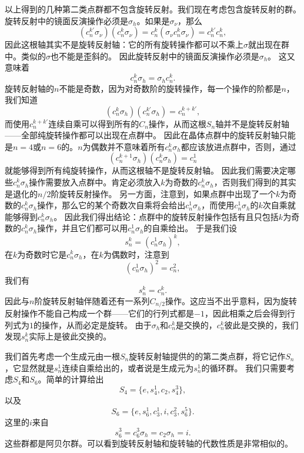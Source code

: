 以上得到的几种第二类点群都不包含旋转反射。我们现在考虑包含旋转反射的群。
旋转反射中的镜面反演操作必须是$\sigma_h$。如果是$\sigma_\nu$，那么
\[
    (c_n^{k'} \sigma_\nu) (c_n^k \sigma_\nu) = c_n^k (\sigma_\nu c_n^k \sigma_\nu) = c_n^{k'} c_n^k, 
\]
因此这根轴其实不是旋转反射轴：它的所有旋转操作都可以不乘上$\sigma$就出现在群中。类似的$\sigma$也不能是歪斜的。
因此旋转反射中的镜面反演操作必须是$\sigma_h$。
这又意味着
\begin{equation}
    c_n^k \sigma_h = \sigma_h c_n^k.
\end{equation}
旋转反射轴的$n$不能是奇数，因为对奇数阶的旋转操作，每一个操作的阶都是$n$，我们知道
\[
    (c_n^k \sigma_h) (c_n^{k'} \sigma_h) = c_n^{k+k'},
\]
而使用$c_n^{k+k'}$连续自乘可以得到所有的$C_n$操作，从而这根$S_n$轴并不是旋转反射轴——全部纯旋转操作都可以出现在点群中。
因此在晶体点群中的旋转反射轴只能是$n=4$或$n=6$的。$n$为偶数并不意味着所有$c_n^k \sigma_h$都应该放进点群中，否则，通过
\[
    (c_n^{k+1} \sigma_h) (c_n^k \sigma_h) = c_n^1
\]
就能够得到所有纯旋转操作，从而这根轴不是旋转反射轴。
因此我们需要决定哪些$c_n^k \sigma_h$操作需要放入点群中。肯定必须放入$k$为奇数的$c_n^k \sigma_h$，否则我们得到的其实是退化的$n/2$阶旋转反射操作。
另一方面，注意到，如果点群中出现了一个$k$为奇数的$c_n^k \sigma_h$操作，那么它的某个奇数次自乘将会给出$c_n^1 \sigma_h$，而使用$c_n^1 \sigma_h$的$k$次自乘就能够得到$c_n^k \sigma_h$。
因此我们得出结论：点群中的旋转反射操作包括有且只包括$k$为奇数的$c_n^k \sigma_h$操作，并且它们都可以用$c_n^1 \sigma_h$的自乘给出。
于是我们设
\begin{equation}
    s_n^k = (c_n^1 \sigma_h)^k,
\end{equation}
在$k$为奇数时它是$c_n^k \sigma_h$，在$k$为偶数时，注意到
\[
    (c_n^1 \sigma_h)^2 = c_n^2,
\]
我们有
\begin{equation}
    s_n^k = c_{n}^{k}.
\end{equation}
因此与$n$阶旋转反射轴伴随着还有一系列$C_{n/2}$操作。这应当不出乎意料，因为旋转反射操作不能自己构成一个群——它们的行列式都是$-1$，因此相乘之后会得到行列式为$1$的操作，从而必定是旋转。
由于$\sigma_h$和$c_n^k$是交换的，$c_n^k$彼此是交换的，我们发现$s_n^k$实际上是彼此交换的。

我们首先考虑一个生成元由一根$S_n$旋转反射轴提供的的第二类点群，将它记作$S_n$，它显然就是$s_n^1$连续自乘给出的，或者说是生成元为$s_n^1$的循环群。
我们只需要考虑$S_4$和$S_6$。简单的计算给出
\begin{equation}
    S_4 = \{e, s_4^1, c_2, s_4^3\},
\end{equation}
以及
\begin{equation}
    S_6 = \{e, s_6^1, c_3^1, i, c_3^2, s_6^5\}.
\end{equation}
这里的$i$来自
\begin{equation}
    s_6^3 = c_6^3 \sigma_h = c_2 \sigma_h = i.
\end{equation}
这些群都是阿贝尔群。可以看到旋转反射轴和旋转轴的代数性质是非常相似的。

